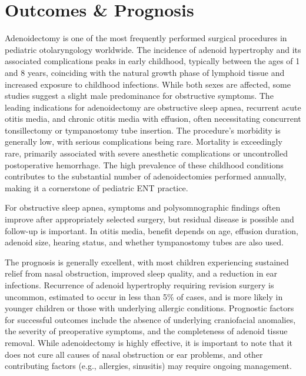 \section*{Outcomes \& Prognosis}
Adenoidectomy is one of the most frequently performed surgical procedures in pediatric otolaryngology worldwide. The incidence of adenoid hypertrophy and its associated complications peaks in early childhood, typically between the ages of 1 and 8 years, coinciding with the natural growth phase of lymphoid tissue and increased exposure to childhood infections. While both sexes are affected, some studies suggest a slight male predominance for obstructive symptoms. The leading indications for adenoidectomy are obstructive sleep apnea, recurrent acute otitis media, and chronic otitis media with effusion, often necessitating concurrent tonsillectomy or tympanostomy tube insertion. The procedure's morbidity is generally low, with serious complications being rare. Mortality is exceedingly rare, primarily associated with severe anesthetic complications or uncontrolled postoperative hemorrhage. The high prevalence of these childhood conditions contributes to the substantial number of adenoidectomies performed annually, making it a cornerstone of pediatric ENT practice.

For obstructive sleep apnea, symptoms and polysomnographic findings often improve after appropriately selected surgery, but residual disease is possible and follow-up is important. In otitis media, benefit depends on age, effusion duration, adenoid size, hearing status, and whether tympanostomy tubes are also used.

The prognosis is generally excellent, with most children experiencing sustained relief from nasal obstruction, improved sleep quality, and a reduction in ear infections. Recurrence of adenoid hypertrophy requiring revision surgery is uncommon, estimated to occur in less than 5\% of cases, and is more likely in younger children or those with underlying allergic conditions. Prognostic factors for successful outcomes include the absence of underlying craniofacial anomalies, the severity of preoperative symptoms, and the completeness of adenoid tissue removal. While adenoidectomy is highly effective, it is important to note that it does not cure all causes of nasal obstruction or ear problems, and other contributing factors (e.g., allergies, sinusitis) may require ongoing management.

